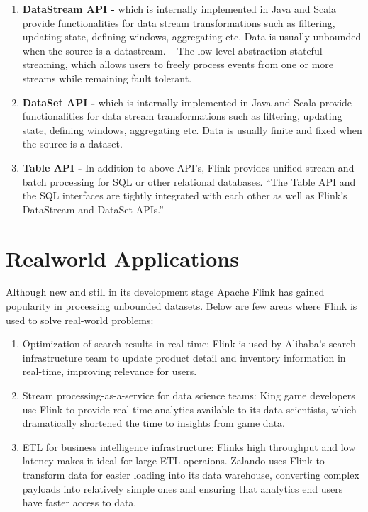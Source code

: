 \begin{enumerate}\item \textbf{DataStream API - } which is internally implemented in Java and Scala provide functionalities for data stream transformations such as filtering, updating state, defining windows, aggregating etc. Data is usually unbounded when the source is a datastream. ~\cite{link6} The low level abstraction stateful streaming, which allows users to freely process events from one or more streams while remaining fault tolerant.~\cite{link4}
\item \textbf{DataSet API - } which is internally implemented in Java and Scala provide functionalities for data stream transformations such as filtering, updating state, defining windows, aggregating etc. Data is usually finite and fixed when the source is a dataset.~\cite{[7]}
\item \textbf{Table API - } In addition to above API's, Flink provides unified stream and batch processing for SQL or other relational databases. ``The Table API and the SQL interfaces are tightly integrated with each other as well as Flink's DataStream and DataSet APIs.''~\cite{link51}\\\end{enumerate}

\section{Realworld Applications}

Although new and still in its development stage Apache Flink has gained popularity in processing unbounded datasets. Below are few areas where Flink is used to solve real-world problems:

\begin{enumerate}\item Optimization of search results in real-time: Flink is used by Alibaba's search infrastructure team to update product detail and inventory information in real-time, improving relevance for users.
\item Stream processing-as-a-service for data science teams: King game developers use Flink to provide real-time analytics available to its data scientists, which dramatically shortened the time to insights from game data.
\item ETL for business intelligence infrastructure: Flinks high throughput and low latency makes it ideal for large ETL operaions. Zalando uses Flink to transform data for easier loading into its data warehouse, converting complex payloads into relatively simple ones and ensuring that analytics end users have faster access to data.~\cite{[link9]} \end{enumerate}

